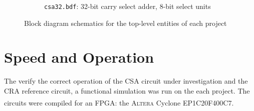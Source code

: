 \documentclass[a4paper,11pt]{article}
\newcommand{\Altera}{\textsc{Altera}\textsuperscript{\textregistered}\xspace}
\begin{document}
\begin{figure}[!h]
\begin{subfigure}[b]{\textwidth}
		\caption{\texttt{csa32.bdf}: 32-bit carry select adder, 8-bit select units}
		\label{fig:csa32.bdf}
	\end{subfigure}
	\caption{Block diagram schematics for the top-level entities of each project}
	\label{fig:top-level}
\end{figure}

\section{Speed and Operation}

The verify the correct operation of the CSA circuit under investigation and the CRA reference circuit, a functional simulation was run on the each project. The circuits were compiled for an FPGA: the \Altera Cyclone EP1C20F400C7.
\end{document}
